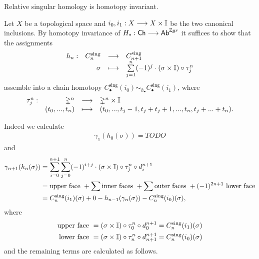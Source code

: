 	\begin{proposition}
		Relative singular homology is homotopy invariant.
	\end{proposition}
	\begin{sketch}
		Let $X$ be a topological space and $i_0,i_1: X --> X \times \mathbb{I}$ be the two canonical inclusions. By homotopy invariance of $H_{*}:\textsf{Ch} --> \textsf{Ab}^{\mathbb{Z} gr}$ it suffices to show that the assignments
		\begin{equation*}
			\begin{array}{rrcl}
			h_n: & C_n^\text{sing} & \longrightarrow & C_{n+1}^\text{sing}\\
			&\sigma & \longmapsto & \sum \limits_{j=1}^n (-1)^j \cdot (\sigma \times \mathbb{I}) \circ \tau_j^n
			\end{array}
		\end{equation*} 
		assemble into a chain homotopy $C_\bullet^\text{sing}(i_0) \sim_{h_\bullet} C_\bullet^\text{sing}(i_1)$, where
		\begin{equation*}
			\begin{array}{rrcl}
				\tau_j^n: & \mathbb{\Delta}^n & \longrightarrow & \mathbb{\Delta}^n \times \mathbb{I}\\
				& (t_0,...,t_n) & \longmapsto & (t_0,...,t_j-1,t_j+t_j+1,...,t_n,t_j+...+t_n).
			\end{array}
		\end{equation*}

		Indeed we calculate
		\begin{align*}
			\gamma_1(h_0(\sigma)) = TODO
		\end{align*}
		and
		\begin{align*}
			\gamma_{n+1}(h_n(\sigma)) &= \sum \limits_{i=0}^{n+1} \sum \limits_{j=0}^n (-1)^{i+j} \cdot (\sigma \times \mathbb{I}) \circ \tau_j^n \circ d_i^{n+1}\\
			&= \text{upper face } + \sum \text{inner faces } + \sum \text{outer faces } + (-1)^{2n+1}\text{ lower face}\\
			&= C_n^\text{sing}(i_1)(\sigma) + 0 - h_{n-1}(\gamma_n(\sigma)) - C_n^\text{sing}(i_0)(\sigma),
		\end{align*}
		where
		\begin{align*}
			\text{upper face } &= (\sigma \times \mathbb{I}) \circ \tau_0^n \circ d_0^{n+1} = C_n^\text{sing}(i_1)(\sigma)\\
			\text{lower face } &= (\sigma \times \mathbb{I}) \circ \tau_n^n \circ d_{n+1}^{n+1} = C_n^\text{sing}(i_0)(\sigma)
		\end{align*}
		and the remaining terms are calculated as follows.


\end{sketch}

